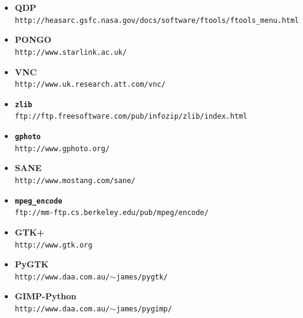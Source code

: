 \documentclass[twoside,11pt]{article}
\newcommand{\htmladdnormallink}[2]{#1}
\begin{document}
\begin{itemize}
\item {\bf\label{sc15_available_qdp}QDP}\\
\htmladdnormallink{{\tt http://heasarc.gsfc.nasa.gov/docs/software/ftools/ftools\_menu.html}}{http://heasarc.gsfc.nasa.gov/docs/software/ftools/ftools\_menu.html}
 
\item {\bf\label{sc15_available_pongo}PONGO}\\
\htmladdnormallink{{\tt http://www.starlink.ac.uk/}}{http://www.starlink.ac.uk/}  

\item {\bf\label{sc15_available_vnc}VNC}\\
\htmladdnormallink{{\tt http://www.uk.research.att.com/vnc/}}{http://www.uk.research.att.com/vnc/} 

\item {\bf\label{sc15_available_zlib}{\tt zlib}}\\
\htmladdnormallink{{\tt ftp://ftp.freesoftware.com/pub/infozip/zlib/index.html}}{ftp://ftp.freesoftware.com/pub/infozip/zlib/index.html} 

\item {\bf\label{sc15_available_gphoto}{\tt gphoto}}\\
\htmladdnormallink{{\tt http://www.gphoto.org/}}{http://www.gphoto.org/} 

\item {\bf\label{sc15_available_sane}SANE}\\
\htmladdnormallink{{\tt http://www.mostang.com/sane/}}{http://www.mostang.com/sane/} 

\item {\bf\label{sc15_available_mpegencode}{\tt mpeg\_encode}}\\
\htmladdnormallink{{\tt ftp://mm-ftp.cs.berkeley.edu/pub/mpeg/encode/}}{ftp://mm-ftp.cs.berkeley.edu/pub/mpeg/encode/} 

\item {\bf\label{sc15_available_gtk+}GTK+}\\
\htmladdnormallink{{\tt http://www.gtk.org}}{http://www.gtk.org} 

\item {\bf\label{sc15_available_pygtk}PyGTK}\\
\htmladdnormallink{{\tt http://www.daa.com.au/$\sim$james/pygtk/}}{http://www.daa.com.au/~james/pygtk/} 

\item {\bf\label{sc15_available_gimppython}GIMP-Python}\\
\htmladdnormallink{{\tt http://www.daa.com.au/$\sim$james/pygimp/}}{http://www.daa.com.au/~james/pygimp/} 


\end{itemize}
\end{document}
